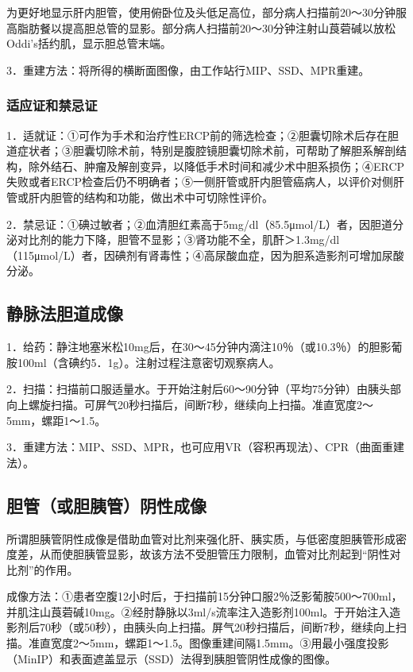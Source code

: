 为更好地显示肝内胆管，使用俯卧位及头低足高位，部分病人扫描前20～30分钟服高脂肪餐以提高胆总管的显影。部分病人扫描前20～30分钟注射山莨菪碱以放松Oddi's括约肌，显示胆总管末端。

3．重建方法：将所得的横断面图像，由工作站行MIP、SSD、MPR重建。

\subsubsection{适应证和禁忌证}

1．适就证：①可作为手术和治疗性ERCP前的筛选检查；②胆囊切除术后存在胆道症状者；③胆囊切除术前，特别是腹腔镜胆囊切除术前，可帮助了解胆系解剖结构，除外结石、肿瘤及解剖变异，以降低手术时间和减少术中胆系损伤；④ERCP失败或者ERCP检查后仍不明确者；⑤一侧肝管或肝内胆管癌病人，以评价对侧肝管或肝内胆管的结构和功能，做出术中可切除性评价。

2．禁忌证：①碘过敏者；②血清胆红素高于5mg/dl（85.5μmol/L）者，因胆道分泌对比剂的能力下降，胆管不显影；③肾功能不全，肌酐＞1.3mg/dl（115μmol/L）者，因碘剂有肾毒性；④高尿酸血症，因为胆系造影剂可增加尿酸分泌。

\subsection{静脉法胆道成像}

1．给药：静注地塞米松10mg后，在30～45分钟内滴注10％（或10.3％）的胆影葡胺100ml（含碘约5．1g）。注射过程注意密切观察病人。

2．扫描：扫描前口服适量水。于开始注射后60～90分钟（平均75分钟）由胰头部向上螺旋扫描。可屏气20秒扫描后，间断7秒，继续向上扫描。准直宽度2～5mm，螺距1～1.5。

3．重建方法：MIP、SSD、MPR，也可应用VR（容积再现法）、CPR（曲面重建法）。

\subsection{胆管（或胆胰管）阴性成像}

所谓胆胰管阴性成像是借助血管对比剂来强化肝、胰实质，与低密度胆胰管形成密度差，从而使胆胰管显影，故该方法不受胆管压力限制，血管对比剂起到“阴性对比剂”的作用。

成像方法：①患者空腹12小时后，于扫描前15分钟口服2％泛影葡胺500～700ml，并肌注山莨菪碱10mg。②经肘静脉以3ml/s流率注入造影剂100ml。于开始注入造影剂后70秒（或50秒），由胰头向上扫描。屏气20秒扫描后，间断7秒，继续向上扫描。准直宽度2～5mm，螺距1～1.5。图像重建间隔1.5mm。③用最小强度投影（MinIP）和表面遮盖显示（SSD）法得到胰胆管阴性成像的图像。

